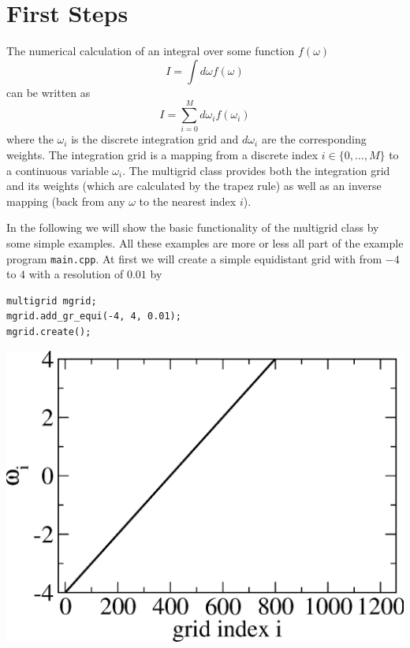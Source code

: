 \section{First Steps}
The numerical calculation of an integral over some function $f(\omega)$
\begin{equation} \label{eqn:integral}
	I=\int d\omega f(\omega)
\end{equation}
can be written as
\begin{equation} \label{eqn:nintegral}
	I=\sum_{i=0}^M d\omega_i f(\omega_i)
\end{equation}
where the $\omega_i$ is the discrete integration grid and $d\omega_i$ are the corresponding weights. The integration grid is a mapping from a discrete index $i\in\{0,\dots,M\}$ to a continuous variable $\omega_i$. The multigrid class provides both the integration grid and its weights (which are calculated by the trapez rule) as well as an inverse mapping (back from any $\omega$ to the nearest index $i$).

In the following we will show the basic functionality of the multigrid class by some simple examples. All these examples are more or less all part of the example program \texttt{main.cpp}. At first we will create a simple equidistant grid with from $-4$ to $4$ with a resolution of $0.01$ by 

\vspace{1cm}
\noindent\begin{minipage}[l]{0.6\textwidth}
\begin{lstlisting}
multigrid mgrid;
mgrid.add_gr_equi(-4, 4, 0.01);
mgrid.create();
\end{lstlisting}
\end{minipage}
\begin{minipage}[]{0.4\textwidth}
	\includegraphics[width=1.0\textwidth]{pics/multigrid_00.eps}
\end{minipage}

